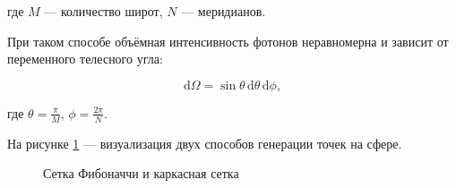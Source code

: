 \noindent где $M$ — количество широт, $N$ — меридианов.

При таком способе объёмная интенсивность фотонов неравномерна и зависит от переменного телесного угла:


\begin{equation}
	\mathrm{d}\Omega = \sin{\theta} \, \mathrm{d}\theta \, \mathrm{d}\phi,
\end{equation}

\noindent где $\displaystyle \theta = \frac{\pi}{M}$, $\displaystyle \phi = \frac{2\pi}{N}$.

На рисунке \ref{img:fibonacci-and-wire-spheres} — визуализация двух способов генерации точек на сфере.

\begin{figure}[ht]
	\captionsetup{justification=centering}
	\caption{Сетка Фибоначчи и каркасная сетка}
	\label{img:fibonacci-and-wire-spheres}
\end{figure}

